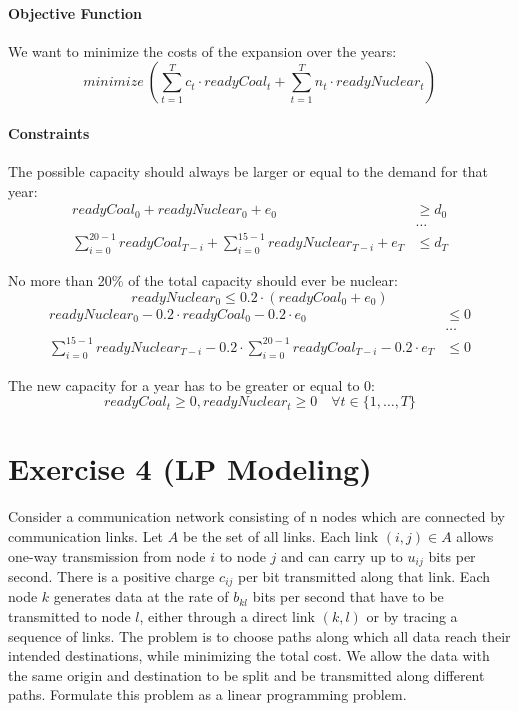 \documentclass[a4paper, 12pt]{report}
\begin{document}
\paragraph{Objective Function} We want to minimize the costs of the expansion
over the years:
\[
    minimize ~
    \left(
        ∑_{t=1}^{T} c_t · readyCoal_t + ∑_{t=1}^{T} n_t · readyNuclear_t
    \right)
\]

\paragraph{Constraints}

The possible capacity should always be larger or equal to the demand for that
year:
\begin{align*}
    readyCoal_0 + readyNuclear_0 + e_0      &≥ d_0\\
                                            &…\\
    ∑_{i=0}^{20-1} readyCoal_{T-i} +
    ∑_{i=0}^{15-1} readyNuclear_{T-i} + e_T &≤ d_T
\end{align*}

No more than 20\% of the total capacity should ever be nuclear:
\[
    readyNuclear_0 ≤ 0.2 · (readyCoal_0 + e_0)
\]
\begin{align*}
    readyNuclear_0 - 0.2 · readyCoal_0 - 0.2 · e_0 &≤ 0\\
                                                   &…\\
    ∑_{i=0}^{15-1} readyNuclear_{T-i} -
    0.2 · ∑_{i=0}^{20-1} readyCoal_{T-i} -
    0.2 · e_T                                      &≤ 0
\end{align*}

The new capacity for a year has to be greater or equal to 0:
\[
    readyCoal_t ≥ 0, readyNuclear_t ≥0 \quad ∀ t ∈ \{1,…,T\}
\]

\section{Exercise 4 (LP Modeling)}

Consider a communication network consisting of n nodes which are connected by
communication links. Let $A$ be the set of all links. Each link $(i,j) ∈ A$
allows one-way transmission from node $i$ to node $j$ and can carry up to
$u_{ij}$ bits per second. There is a positive charge $c_{ij}$ per bit
transmitted along that link. Each node $k$ generates data at the rate of
$b_{kl}$ bits per second that have to be transmitted to node $l$, either
through a direct link $(k,l)$ or by tracing a sequence of links. The problem is
to choose paths along which all data reach their intended destinations, while
minimizing the total cost. We allow the data with the same origin and
destination to be split and be transmitted along different paths. Formulate
this problem as a linear programming problem.
\end{document}
